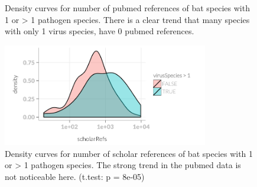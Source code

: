 \begin{knitrout}
\begin{figure}[t]
{}

\caption[Density of number of pubmed references 1 or >1 viruses.]{Density curves for number of pubmed references of bat species with 1 or > 1 pathogen species.
There is a clear trend that many species with only 1 virus species, have 0 pubmed references.
}\label{fig:rm1vir}
\end{figure}

\begin{figure}[t]

{\centering \includegraphics[width=0.8\textwidth]{figure/rm1vir-4} 

}

\caption[Density of number of scholar references 1 or >1 viruses.]{Density curves for number of scholar references of bat species with 1 or > 1 pathogen species.
The strong trend in the pubmed data is not noticeable here.
(t.test: p = 8e-05)}\label{fig:rm1vir}
\end{figure}


\end{knitrout}



\clearpage


